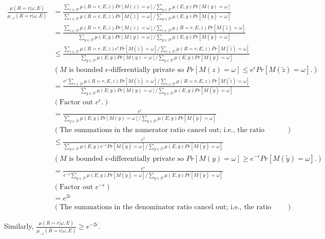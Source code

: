 \begin{align*}
    \frac{\mu(R=r | \omega, E)}{\mu_{-i}(R=r | \omega, E)} &=
    \frac{\sum_{z \in \mathcal{D}}\mu(R=r, E, z) Pr[M(z)=\omega]/\sum_{y \in \mathcal{D}}\mu(E, y)Pr[M(y)=\omega]}{\sum_{z \in \mathcal{D}}\mu(R=r, E, z) Pr[M(\tilde{z})=\omega] / \sum_{y \in \mathcal{D}}\mu(E, y)Pr[M(\tilde{y})=\omega]}\\
    &= 
    \frac{\sum_{z \in \mathcal{D}}\mu(R=r, E, z) Pr[M(z)=\omega] / \sum_{z \in \mathcal{D}}\mu(R=r, E, z) Pr[M(\tilde{z})=\omega] }{\sum_{y \in \mathcal{D}}\mu(E, y)Pr[M(y)=\omega] / \sum_{y \in \mathcal{D}}\mu(E, y)Pr[M(\tilde{y})=\omega] } \\
    &\leq
    \frac{\sum_{z \in \mathcal{D}}\mu(R=r, E, z)e^{\epsilon} Pr[M(\tilde{z})=\omega] / \sum_{z \in \mathcal{D}}\mu(R=r, E, z) Pr[M(\tilde{z})=\omega] }{\sum_{y \in \mathcal{D}}\mu(E, y)Pr[M(y)=\omega] / \sum_{y \in \mathcal{D}}\mu(E, y)Pr[M(\tilde{y})=\omega] } \\
    &(\text{$M$ is bounded $\epsilon$-differentially private so $Pr[M(z)= \omega] \leq e^\epsilon Pr[M(\tilde{z}) = \omega]$.}) \\
    &=
    \frac{e^\epsilon\sum_{z \in \mathcal{D}}\mu(R=r, E, z) Pr[M(\tilde{z})=\omega] / \sum_{z \in \mathcal{D}}\mu(R=r, E, z) Pr[M(\tilde{z})=\omega] }{\sum_{y \in \mathcal{D}}\mu(E, y)Pr[M(y)=\omega] / \sum_{y \in \mathcal{D}}\mu(E, y)Pr[M(\tilde{y})=\omega] } \\
    &(\text{Factor out $e^\epsilon$.}) \\
    &=
    \frac{e^\epsilon}{\sum_{y \in \mathcal{D}}\mu(E, y)Pr[M(y)=\omega] / \sum_{y \in \mathcal{D}}\mu(E, y)Pr[M(\tilde{y})=\omega] } \\
    &(\text{The summations in the numerator ratio cancel out; i.e., the ratio equals 1.}) \\
    &\leq
    \frac{e^\epsilon}{\sum_{y \in \mathcal{D}}\mu(E, y)e^{-\epsilon}Pr[M(\tilde{y})=\omega] / \sum_{y \in \mathcal{D}}\mu(E, y)Pr[M(\tilde{y})=\omega] } \\
    &(\text{$M$ is bounded $\epsilon$-differentially private so $Pr[M(y)= \omega] \geq e^{-\epsilon} Pr[M(\tilde{y}) = \omega]$.}) \\
    &=
    \frac{e^\epsilon}{e^{-\epsilon}\sum_{y \in \mathcal{D}}\mu(E, y)Pr[M(\tilde{y})=\omega] / \sum_{y \in \mathcal{D}}\mu(E, y)Pr[M(\tilde{y})=\omega] } \\
    &(\text{Factor out $e^{-\epsilon}$}) \\
    &=
    e^{2\epsilon} \\
    &(\text{The summations in the denominator ratio cancel out; i.e., the ratio equals 1.})
\end{align*}

Similarly,  $\frac{\mu(R=r | \omega, E)}{\mu_{-i}(R=r | \omega, E)} \geq e^{-2\epsilon}$.



